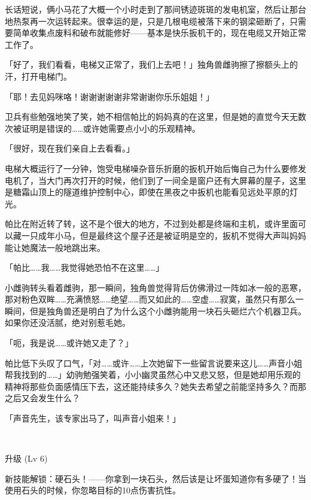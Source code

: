\horizonline


长话短说，俩小马花了大概一个小时走到了那间锈迹斑斑的发电机室，然后让那台地热泵再一次运转起来。很幸运的是，只是几根电缆被落下来的钢梁砸断了，只需要简单收集点废料和破布就能修好——基本是快乐扳机干的，现在电缆又开始正常工作了。

「好了，我们看看，电梯又正常了，我们上去吧！」独角兽雌驹擦了擦额头上的汗，打开电梯门。

「耶！去见妈咪咯！谢谢谢谢谢非常谢谢你乐乐姐姐！」

卫兵有些勉强地笑了笑，她不相信帕比的妈妈真的在这里，但是她的直觉今天无数次被证明是错误的……或许她需要点小小的乐观精神。

「很好，现在我们亲自上去看看。」

电梯大概运行了一分钟，饱受电梯噪杂音乐折磨的扳机开始后悔自己为什么要修发电机了，当大门再次打开的时候，他们到了一间全是窗户还有大屏幕的屋子，这里是糖霜山顶上的隧道维护控制中心，即使在黑夜之中扳机也能看见远处平原的灯光。

帕比在附近转了转，这不是个很大的地方，不过到处都是终端和主机，或许里面可以藏一只成年小马，但是最终这个屋子还是被证明是空的，扳机不觉得大声叫妈妈能让她魔法一般地跳出来。

「帕比……我……我觉得她恐怕不在这里……」

小雌驹转头看着雌驹，那一瞬间，独角兽觉得背后仿佛滑过一阵如冰一般的恶寒，那对粉色双眸……充满愤怒……绝望……而又如此的……空虚……寂寞，虽然只有那么一瞬间，但是独角兽还是明白了为什么这个小雌驹能用一块石头砸烂六个机器卫兵。如果你还没活腻，绝对别惹毛她。

「呃，我是说……或许她又走了？」

帕比低下头叹了口气，「对……或许……上次她留下一些留言说要来这儿……声音小姐帮我找到的……」幼驹勉强笑着，小小幽灵虽然心中又悲又怒，但是她却用乐观的精神将那些负面感情压下去，这还能持续多久？她失去希望之前能坚持多久？而那之后又会发生什么？

「声音先生，该专家出马了，叫声音小姐来！」

~\vfill

\begin{note}
    升级 (Lv 6)

    新技能解锁：硬石头！——你拿到一块石头，然后该是让坏蛋知道你有多硬了！当使用石头的时候，你忽略目标的10点伤害抗性。
\end{note}




